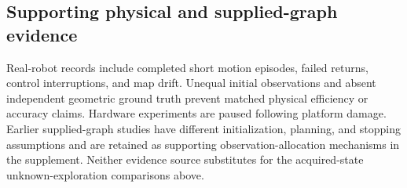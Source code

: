 

\subsection{Supporting physical and supplied-graph evidence}
Real-robot records include completed short motion episodes, failed returns, control interruptions, and map drift. Unequal initial observations and absent independent geometric ground truth prevent matched physical efficiency or accuracy claims. Hardware experiments are paused following platform damage. Earlier supplied-graph studies have different initialization, planning, and stopping assumptions and are retained as supporting observation-allocation mechanisms in the supplement. Neither evidence source substitutes for the acquired-state unknown-exploration comparisons above.
